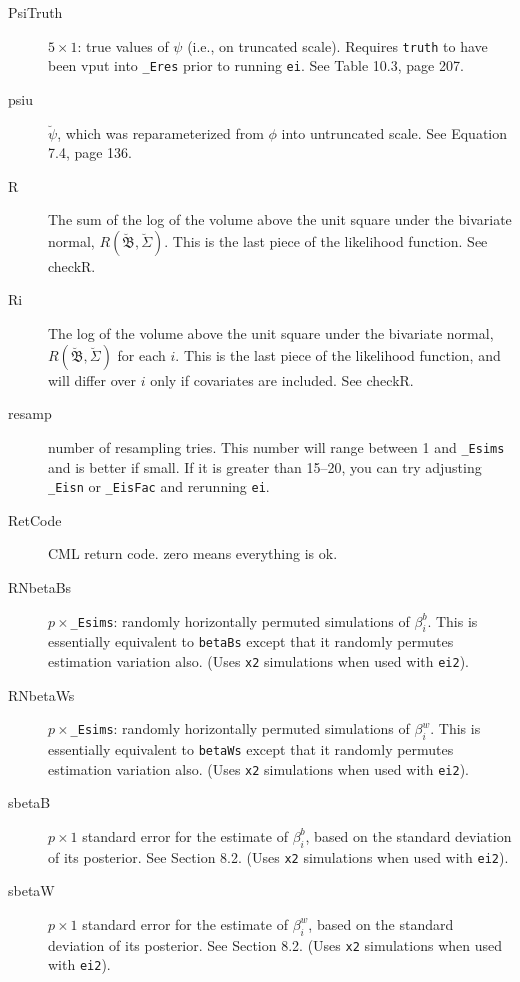\documentclass[11pt,titlepage]{article}
\newcommand{\bbetau}{\breve{\mathfrak B}}
\newcommand{\Sigmau}{\breve{\Sigma}}
\newcommand{\psiu}{\breve{\psi}}
\begin{document}
\begin{description}
\item[PsiTruth] $5\times 1$: true values of $\psi$ (i.e., on truncated
  scale).  Requires \texttt{truth} to have been vput into
  \texttt{\_Eres} prior to running \texttt{ei}. See Table 10.3, page
  207.

\item[psiu] $\psiu$, which was reparameterized from $\phi$ into
  untruncated scale.  See Equation 7.4, page 136.

\item[R] The sum of the log of the volume above the unit square under
  the bivariate normal, $R(\bbetau,\Sigmau)$.  This is the last piece
  of the likelihood function.  See checkR.

\item[Ri] The log of the volume above the unit square under the
  bivariate normal, $R(\bbetau,\Sigmau)$ for each $i$.  This is the
  last piece of the likelihood function, and will differ over $i$ only
  if covariates are included.  See checkR.

\item[resamp] number of resampling tries.  This number will range
  between 1 and \texttt{\_Esims} and is better if small.  If it is
  greater than 15--20, you can try adjusting \texttt{\_Eisn} or
  \texttt{\_EisFac} and rerunning \texttt{ei}.

\item[RetCode] CML return code.  zero means everything is ok.

\item[RNbetaBs] $p\times$\texttt{\_Esims}: randomly horizontally
  permuted simulations of $\beta_i^b$.  This is essentially equivalent
  to \texttt{betaBs} except that it randomly permutes estimation
  variation also.  (Uses \texttt{x2} simulations when used with
  \texttt{ei2}).

\item[RNbetaWs] $p\times$\texttt{\_Esims}: randomly horizontally
  permuted simulations of $\beta_i^w$.  This is essentially equivalent
  to \texttt{betaWs} except that it randomly permutes estimation
  variation also.  (Uses \texttt{x2} simulations when used with
  \texttt{ei2}).

\item[sbetaB] $p\times 1$ standard error for the estimate of
  $\beta_i^b$, based on the standard deviation of its posterior.  See
  Section 8.2.  (Uses \texttt{x2} simulations when used
  with \texttt{ei2}).

\item[sbetaW] $p\times 1$ standard error for the estimate of
  $\beta_i^w$, based on the standard deviation of its posterior.  See
  Section 8.2.  (Uses \texttt{x2} simulations when used
  with \texttt{ei2}).


\end{description}
\end{document}
